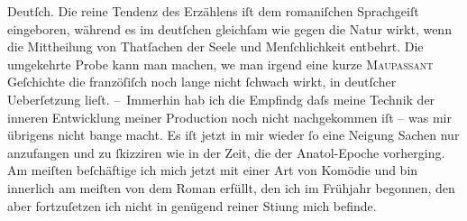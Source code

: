 \begin{ledgroupsized}[t]{13cm}
               Deutſch. Die reine Tendenz des Erzählens iſt dem romaniſchen Sprachgeiſt eingeboren,
               während es im deutſchen gleichſam wie gegen die Natur wirkt, wenn die Mittheilung von
               Thatſachen der Seele und Menſchlichkeit entbehrt. Die umgekehrte Probe kann man
               machen, we{\geminationn} man irgend eine kurze \textsc{Maupassant} Geſchichte die franzöſiſch noch lange nicht ſchwach wirkt, in deutſcher
               Ueberſetzung lieſt.\pend
           \pstart
           – Immerhin hab ich die Empfindg daſs {\pb}meine Technik der
               inneren Entwicklung meiner Production noch nicht nachgekommen iſt – was mir übrigens
               nicht bange macht. Es iſt jetzt in mir wieder ſo eine Neigung Sachen nur anzufangen
               und zu ſkizziren wie in der Zeit, die der Anatol-Epoche vorherging. Am meiſten beſchäftige ich mich jetzt mit einer Art
               von Komödie und bin innerlich
                   am meiſten von dem Roman
               erfüllt, den ich im Frühjahr begonnen, den aber fortzuſetzen ich nicht in genügend
               reiner Sti{\geminationm}ung mich befinde.\pend
           \pstart

\end{ledgroupsized}
